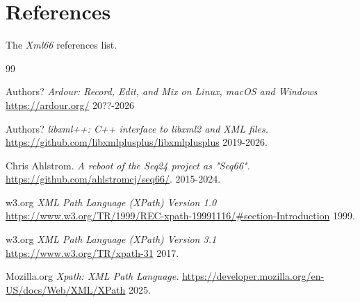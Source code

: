 %
%
%

\section{References}
\label{sec:references}

   The \textsl{Xml66} references list.

{\RaggedRight
\begin{thebibliography}{99}

   Authors?
   \emph{Ardour: Record, Edit, and Mix on Linux, macOS and Windows}
   \url{https://ardour.org/}
   20??-2026

   Authors?
   \emph{libxml++: C++ interface to libxml2 and XML files.}
   \url{https://github.com/libxmlplusplus/libxmlplusplus}
   2019-2026.

   Chris Ahlstrom.
   \emph{A reboot of the Seq24 project as "Seq66".}
   \url{https://github.com/ahlstromcj/seq66/}.
   2015-2024.

   w3.org
   \emph{XML Path Language (XPath) Version 1.0}
   \url{https://www.w3.org/TR/1999/REC-xpath-19991116/#section-Introduction}
   1999.

   w3.org
   \emph{XML Path Language (XPath) Version 3.1}
   \url{https://www.w3.org/TR/xpath-31}
   2017.

   Mozilla.org
   \emph{Xpath: XML Path Language.}
   \url{https://developer.mozilla.org/en-US/docs/Web/XML/XPath}
   2025.

\end{thebibliography}
}

